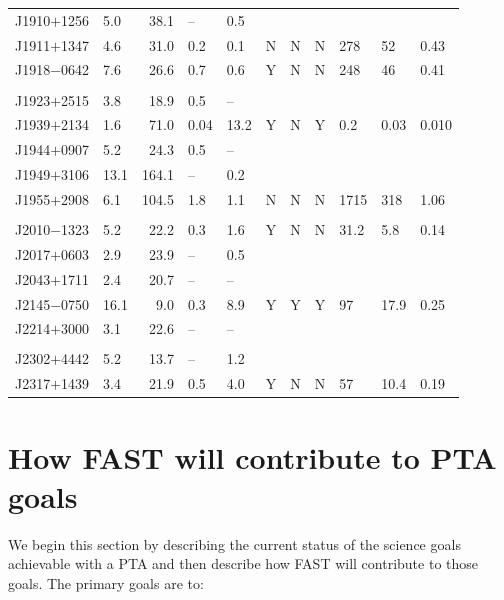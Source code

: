 \documentclass{raa}            %
\begin{document}
\begin{table}
\begin{tabular}{llrllllllll}
J1910$+$1256 & 5.0 & 38.1 & -- & 0.5 \\
J1911$+$1347 & 4.6 & 31.0 & 0.2 & 0.1 & N & N & N & 278 & 52 & 0.43 \\
J1918$-$0642 & 7.6 & 26.6 & 0.7 & 0.6 & Y & N & N & 248 & 46 & 0.41 \\
\\
J1923$+$2515 & 3.8 & 18.9 & 0.5 &  -- \\
J1939$+$2134 & 1.6 & 71.0 & 0.04 & 13.2 & Y & N & Y & 0.2 & 0.03 & 0.010 \\
J1944$+$0907 &  5.2 & 24.3 & 0.5 & -- \\
J1949$+$3106 & 13.1 & 164.1 & -- & 0.2 \\
J1955$+$2908 & 6.1 & 104.5 & 1.8 & 1.1 & N  & N & N & 1715 & 318 & 1.06 \\
\\
J2010$-$1323 & 5.2 & 22.2 & 0.3 & 1.6 & Y & N & N & 31.2 & 5.8 & 0.14 \\
J2017$+$0603 & 2.9 & 23.9 & -- & 0.5 \\
J2043$+$1711 & 2.4 & 20.7 & -- & -- \\
J2145$-$0750 & 16.1 & 9.0 & 0.3 & 8.9 & Y  & Y & Y & 97 & 17.9 & 0.25 \\
J2214$+$3000 & 3.1 & 22.6 & -- & -- \\
\\
J2302$+$4442 & 5.2 & 13.7 & -- & 1.2 \\
J2317$+$1439 & 3.4 & 21.9 & 0.5 & 4.0 & Y & N & N & 57 & 10.4 & 0.19 \\
\hline

\end{tabular}
\end{table}

\section{How FAST will contribute to PTA goals}\label{sec:currentStatus}

We begin this section by describing the current status of the science goals achievable with a PTA and then describe how FAST will contribute to those goals.   The primary goals are to:
\end{document}
